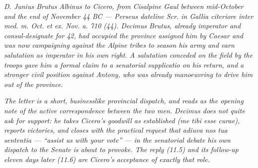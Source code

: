 
\textit{D. Junius Brutus Albinus to Cicero, from Cisalpine
Gaul between mid-October and the end of November 44 BC ---
Perseus dateline \textit{Scr. in Gallia citeriore inter
med. m. Oct. et ex. Nov. a. 710 (44)}. Decimus Brutus,
already \textit{imperator} and consul-designate for 42,
had occupied the province assigned him by Caesar and was
now campaigning against the Alpine tribes to season his
army and earn salutation as imperator in his own right. A
salutation conceded on the field by the troops gave him a
formal claim to a senatorial \textit{supplicatio} on his
return, and a stronger civil position against Antony, who
was already manoeuvring to drive him out of the province.}

\textit{The letter is a short, businesslike provincial
dispatch, and reads as the opening note of the active
correspondence between the two men. Decimus does not
quite ask for support: he takes Cicero's goodwill as
established (\textit{me tibi esse curae}), reports
victories, and closes with the practical request that
\textit{adiuva nos tua sententia} --- ``assist us with
your vote'' --- in the senatorial debate his own dispatch
to the Senate is about to provoke. The reply (11.5) and
its follow-up eleven days later (11.6) are Cicero's
acceptance of exactly that role.}
